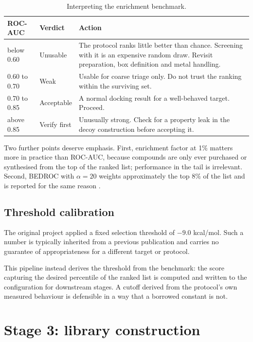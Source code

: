 \documentclass[11pt,a4paper]{article}
\begin{document}
\begin{table}[htbp]
\centering
\small
\caption{Interpreting the enrichment benchmark.}
\begin{tabular}{p{2.1cm}p{2.5cm}p{9cm}}
\toprule
\textbf{ROC-AUC} & \textbf{Verdict} & \textbf{Action} \\
\midrule
below 0.60 & Unusable & The protocol ranks little better than chance. Screening
with it is an expensive random draw. Revisit preparation, box definition and
metal handling. \\
0.60 to 0.70 & Weak & Usable for coarse triage only. Do not trust the ranking
within the surviving set. \\
0.70 to 0.85 & Acceptable & A normal docking result for a well-behaved target.
Proceed. \\
above 0.85 & Verify first & Unusually strong. Check for a property leak in the
decoy construction before accepting it. \\
\bottomrule
\end{tabular}
\end{table}

Two further points deserve emphasis. First, enrichment factor at 1\% matters
more in practice than ROC-AUC, because compounds are only ever purchased or
synthesised from the top of the ranked list; performance in the tail is
irrelevant. Second, BEDROC with $\alpha = 20$ weights approximately the top 8\%
of the list and is reported for the same reason \cite{truchon2007}.

\subsection{Threshold calibration}

The original project applied a fixed selection threshold of $-9.0$ kcal/mol.
Such a number is typically inherited from a previous publication and carries no
guarantee of appropriateness for a different target or protocol.

This pipeline instead derives the threshold from the benchmark: the score
capturing the desired percentile of the ranked list is computed and written to
the configuration for downstream stages. A cutoff derived from the protocol's
own measured behaviour is defensible in a way that a borrowed constant is not.

\section{Stage 3: library construction}
\end{document}
